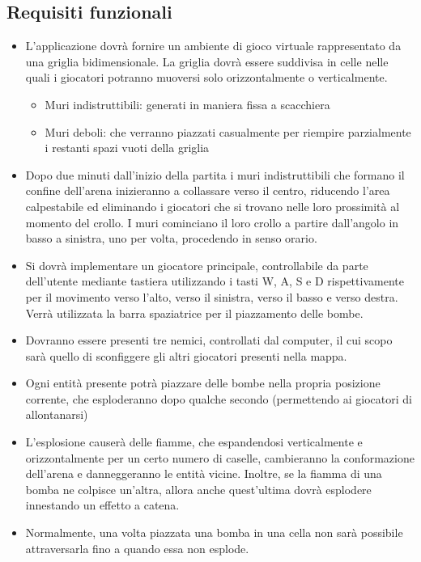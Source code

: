 \documentclass[a4paper,12pt]{report}
\begin{document}
\subsection*{Requisiti funzionali}
\begin{itemize}
	\item L'applicazione dovrà fornire un ambiente di gioco virtuale rappresentato da una griglia bidimensionale. La griglia dovrà essere suddivisa in celle nelle quali i giocatori potranno muoversi solo orizzontalmente o verticalmente.
            \begin{itemize}La griglia verrà riempita da due tipologie di ostacoli:
                \item Muri indistruttibili: generati in maniera fissa a scacchiera
                \item Muri deboli: che verranno piazzati casualmente per riempire parzialmente i restanti spazi vuoti della griglia
            \end{itemize}
	\item Dopo due minuti dall’inizio della partita i muri indistruttibili che formano il confine dell’arena inizieranno a collassare verso il centro, riducendo l’area calpestabile ed eliminando i giocatori che si trovano nelle loro prossimità al momento del crollo. I muri cominciano il loro crollo a partire dall’angolo in basso a sinistra, uno per volta, procedendo in senso orario.
	\item Si dovrà implementare un giocatore principale, controllabile da parte dell’utente mediante tastiera utilizzando i tasti W, A, S e D rispettivamente per il movimento verso l’alto, verso il sinistra, verso il basso e verso destra. Verrà utilizzata la barra spaziatrice per il piazzamento delle bombe.
	\item Dovranno essere presenti tre nemici, controllati dal computer, il cui scopo sarà quello di sconfiggere gli altri giocatori presenti nella mappa.
	\item Ogni entità presente potrà piazzare delle bombe nella propria posizione corrente, che esploderanno dopo qualche secondo (permettendo ai giocatori di allontanarsi)
        \item L’esplosione causerà delle fiamme, che espandendosi verticalmente e orizzontalmente per un certo numero di caselle, cambieranno la conformazione dell’arena e danneggeranno le entità vicine. Inoltre, se la fiamma di una bomba ne colpisce un’altra, allora anche quest'ultima dovrà esplodere innestando un effetto a catena.
        \item Normalmente, una volta piazzata una bomba in una cella non sarà possibile attraversarla fino a quando essa non esplode. 

\end{itemize}
\end{document}
